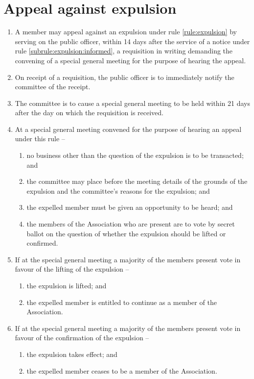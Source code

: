 \section{Appeal against expulsion}
\label{rule:appeal}

\begin{enumerate}
	\item A member may appeal against an expulsion under rule \ref{rule:expulsion} by serving on the public officer, within 14 days after the service of a notice under rule \ref{subrule:expulsion:informed}, a requisition in writing demanding the convening of a special general meeting for the purpose of hearing the appeal.
	\item On receipt of a requisition, the public officer is to immediately notify the committee of the receipt.
	\item The committee is to cause a special general meeting to be held within 21 days after the day on which the requisition is received.

	\item At a special general meeting convened for the purpose of hearing an appeal under this rule --
	\begin{enumerate}
		\item no business other than the question of the expulsion is to be transacted; and
		\item the committee may place before the meeting details of the grounds of the expulsion and the committee's reasons for the expulsion; and
		\item the expelled member must be given an opportunity to be heard; and
		\item the members of the Association who are present are to vote by secret ballot on the question of whether the expulsion should be lifted or confirmed.
	\end{enumerate}

	\item If at the special general meeting a majority of the members present vote in favour of the lifting of the expulsion --
	\begin{enumerate}
		\item the expulsion is lifted; and
		\item the expelled member is entitled to continue as a member of the Association.
	\end{enumerate}
	
	\item If at the special general meeting a majority of the members present vote in favour of the confirmation of the expulsion --
	\begin{enumerate}
		\item the expulsion takes effect; and
		\item the expelled member ceases to be a member of the Association.
	\end{enumerate}
\end{enumerate}